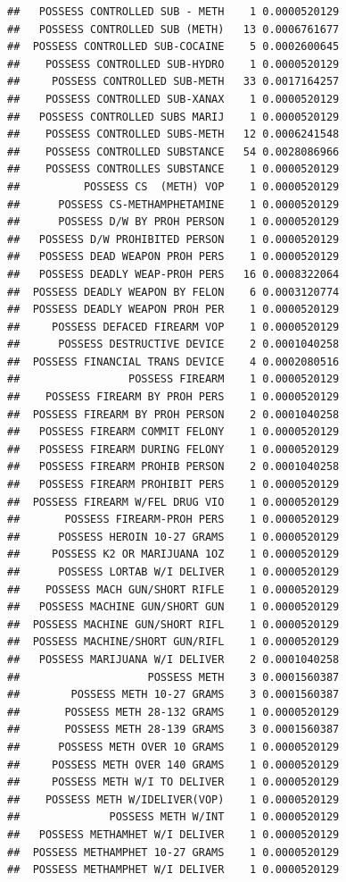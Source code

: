 \documentclass[]{book}
\begin{document}
\begin{verbatim}
##   POSSESS CONTROLLED SUB - METH    1 0.0000520129
##   POSSESS CONTROLLED SUB (METH)   13 0.0006761677
##  POSSESS CONTROLLED SUB-COCAINE    5 0.0002600645
##    POSSESS CONTROLLED SUB-HYDRO    1 0.0000520129
##     POSSESS CONTROLLED SUB-METH   33 0.0017164257
##    POSSESS CONTROLLED SUB-XANAX    1 0.0000520129
##   POSSESS CONTROLLED SUBS MARIJ    1 0.0000520129
##    POSSESS CONTROLLED SUBS-METH   12 0.0006241548
##    POSSESS CONTROLLED SUBSTANCE   54 0.0028086966
##    POSSESS CONTROLLES SUBSTANCE    1 0.0000520129
##          POSSESS CS  (METH) VOP    1 0.0000520129
##      POSSESS CS-METHAMPHETAMINE    1 0.0000520129
##      POSSESS D/W BY PROH PERSON    1 0.0000520129
##   POSSESS D/W PROHIBITED PERSON    1 0.0000520129
##   POSSESS DEAD WEAPON PROH PERS    1 0.0000520129
##   POSSESS DEADLY WEAP-PROH PERS   16 0.0008322064
##  POSSESS DEADLY WEAPON BY FELON    6 0.0003120774
##  POSSESS DEADLY WEAPON PROH PER    1 0.0000520129
##     POSSESS DEFACED FIREARM VOP    1 0.0000520129
##      POSSESS DESTRUCTIVE DEVICE    2 0.0001040258
##  POSSESS FINANCIAL TRANS DEVICE    4 0.0002080516
##                 POSSESS FIREARM    1 0.0000520129
##    POSSESS FIREARM BY PROH PERS    1 0.0000520129
##  POSSESS FIREARM BY PROH PERSON    2 0.0001040258
##   POSSESS FIREARM COMMIT FELONY    1 0.0000520129
##   POSSESS FIREARM DURING FELONY    1 0.0000520129
##   POSSESS FIREARM PROHIB PERSON    2 0.0001040258
##   POSSESS FIREARM PROHIBIT PERS    1 0.0000520129
##  POSSESS FIREARM W/FEL DRUG VIO    1 0.0000520129
##       POSSESS FIREARM-PROH PERS    1 0.0000520129
##      POSSESS HEROIN 10-27 GRAMS    1 0.0000520129
##     POSSESS K2 OR MARIJUANA 1OZ    1 0.0000520129
##      POSSESS LORTAB W/I DELIVER    1 0.0000520129
##    POSSESS MACH GUN/SHORT RIFLE    1 0.0000520129
##   POSSESS MACHINE GUN/SHORT GUN    1 0.0000520129
##  POSSESS MACHINE GUN/SHORT RIFL    1 0.0000520129
##  POSSESS MACHINE/SHORT GUN/RIFL    1 0.0000520129
##   POSSESS MARIJUANA W/I DELIVER    2 0.0001040258
##                    POSSESS METH    3 0.0001560387
##        POSSESS METH 10-27 GRAMS    3 0.0001560387
##       POSSESS METH 28-132 GRAMS    1 0.0000520129
##       POSSESS METH 28-139 GRAMS    3 0.0001560387
##      POSSESS METH OVER 10 GRAMS    1 0.0000520129
##     POSSESS METH OVER 140 GRAMS    1 0.0000520129
##     POSSESS METH W/I TO DELIVER    1 0.0000520129
##    POSSESS METH W/IDELIVER(VOP)    1 0.0000520129
##              POSSESS METH W/INT    1 0.0000520129
##   POSSESS METHAMHET W/I DELIVER    1 0.0000520129
##  POSSESS METHAMPHET 10-27 GRAMS    1 0.0000520129
##  POSSESS METHAMPHET W/I DELIVER    1 0.0000520129

\end{verbatim}
\end{document}

